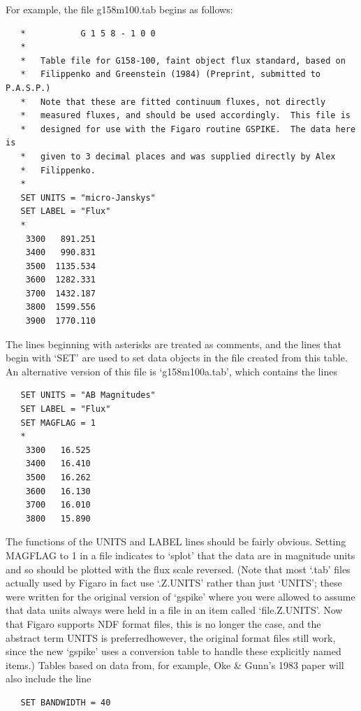    For example, the file g158m100.tab begins as follows:

\begin{verbatim}
   *           G 1 5 8 - 1 0 0
   *
   *   Table file for G158-100, faint object flux standard, based on
   *   Filippenko and Greenstein (1984) (Preprint, submitted to P.A.S.P.)
   *   Note that these are fitted continuum fluxes, not directly
   *   measured fluxes, and should be used accordingly.  This file is
   *   designed for use with the Figaro routine GSPIKE.  The data here is
   *   given to 3 decimal places and was supplied directly by Alex
   *   Filippenko.
   *
   SET UNITS = "micro-Janskys"
   SET LABEL = "Flux"
   *
    3300   891.251
    3400   990.831
    3500  1135.534
    3600  1282.331
    3700  1432.187
    3800  1599.556
    3900  1770.110
\end{verbatim}

   The lines beginning with asterisks are treated as comments, and the
   lines that begin with `SET' are used to set data objects in the file
   created from this table.  An alternative version of this file is
   `g158m100a.tab', which contains the lines

\begin{verbatim}
   SET UNITS = "AB Magnitudes"
   SET LABEL = "Flux"
   SET MAGFLAG = 1
   *
    3300   16.525
    3400   16.410
    3500   16.262
    3600   16.130
    3700   16.010
    3800   15.890
\end{verbatim}

   The functions of the UNITS and LABEL lines should be fairly obvious.
   Setting MAGFLAG to 1 in a file indicates to `splot' that the data are
   in magnitude units and so should be plotted with the flux scale
   reversed. (Note that most `.tab' files actually used by Figaro in
   fact use `.Z.UNITS' rather than just `UNITS'; these were written for
   the original version of `gspike' where you were allowed to assume that
   data units always were held in a file in an item called
   `file.Z.UNITS'.  Now that Figaro supports NDF format files, this is
   no longer the case, and the abstract term UNITS is
   preferred\latorhtm{---}{-}however, the original format files still work,
   since the new `gspike'
   uses a conversion table to handle these explicitly named items.)
   Tables based on data from, for example, Oke \& Gunn's 1983 paper
   will also include the line

\begin{verbatim}
   SET BANDWIDTH = 40
\end{verbatim}

